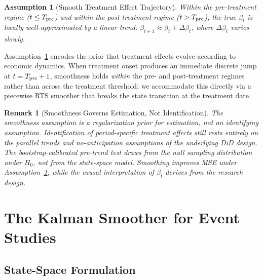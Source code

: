 \documentclass[12pt]{article}
\newtheorem{assumption}{Assumption}
\newtheorem{remark}{Remark}
\begin{document}
\begin{assumption}[Smooth Treatment Effect Trajectory]\label{a:smooth}
Within the pre-treatment regime ($t \le T_{\rm pre}$) and within the post-treatment regime ($t > T_{\rm pre}$), the true $\beta_t$ is locally well-approximated by a linear trend: $\beta_{t+1} \approx \beta_t + \Delta\beta_t$, where $\Delta\beta_t$ varies slowly.
\end{assumption}

Assumption~\ref{a:smooth} encodes the prior that treatment effects evolve according to economic dynamics. When treatment onset produces an immediate discrete jump at $t = T_{\rm pre} + 1$, smoothness holds \emph{within} the pre- and post-treatment regimes rather than across the treatment threshold; we accommodate this directly via a piecewise RTS smoother that breaks the state transition at the treatment date.

\begin{remark}[Smoothness Governs Estimation, Not Identification]
The smoothness assumption is a regularization prior for \emph{estimation}, not an identifying assumption. Identification of period-specific treatment effects still rests entirely on the parallel trends and no-anticipation assumptions of the underlying DiD design. The bootstrap-calibrated pre-trend test draws from the null sampling distribution under $H_0$, not from the state-space model. Smoothing improves MSE under Assumption~\ref{a:smooth}, while the causal interpretation of $\beta_t$ derives from the research design.
\end{remark}

\section{The Kalman Smoother for Event Studies}

\subsection{State-Space Formulation}
\end{document}
